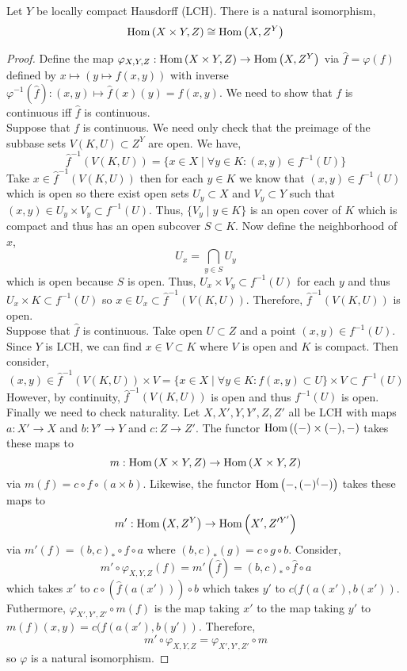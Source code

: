 \documentclass[12pt]{extarticle}
\begin{document}
\begin{lemma}
Let $Y$ be locally compact Hausdorff (LCH). There is a natural isomorphism,
\[\mathrm{Hom}\left( X \times Y, Z \right) \cong \mathrm{Hom}\left( X, Z^Y \right)\]
\end{lemma}

\begin{proof}
Define the map $\varphi_{X,Y,Z} : \mathrm{Hom}\left( X \times Y, Z \right) \to \mathrm{Hom}\left( X, Z^Y \right)$ via $\hat{f} = \varphi(f)$ defined by $x \mapsto (y \mapsto f(x, y))$ with inverse $\varphi^{-1}(\hat{f}) : (x, y) \mapsto \hat{f}(x)(y) = f(x, y)$. We need to show that $f$ is continuous iff $\hat{f}$ is continuous. 
\bigskip
\\
Suppose that $f$ is continuous. We need only check that the preimage of the subbase sets $V(K, U) \subset Z^Y$ are open. We have,
\[ \hat{f}^{-1}(V(K, U)) = \{ x \in X \mid \forall y \in K : (x, y) \in f^{-1}(U) \} \]
Take $x \in \hat{f}^{-1}(V(K, U))$ then for each $y \in K$ we know that $(x, y) \in f^{-1}(U)$ which is open so there exist open sets $U_y \subset X$ and $V_y \subset Y$ such that $(x, y) \in U_y \times V_y \subset f^{-1}(U)$. Thus, $\{ V_y \mid y \in K \}$ is an open cover of $K$ which is compact and thus has an open subcover $S \subset K$. Now define the neighborhood of $x$,
\[ U_x = \bigcap_{y \in S} U_y \]
which is open because $S$ is open. Thus, $U_x \times V_y \subset f^{-1}(U)$ for each $y$ and thus $U_x \times K \subset f^{-1}(U)$ so $x \in U_x \subset \hat{f}^{-1}(V(K, U))$. Therefore, $\hat{f}^{-1}(V(K, U))$ is open. 
\bigskip
\\
Suppose that $\hat{f}$ is continuous. Take open $U \subset Z$ and a point $(x, y) \in f^{-1}(U)$. Since $Y$ is LCH, we can find $x \in V \subset K$ where $V$ is open and $K$ is compact. Then consider,
\[ (x, y) \in \hat{f}^{-1}(V(K, U)) \times V = \{ x \in X \mid \forall y \in K : f(x, y) \subset U \} \times V \subset f^{-1}(U)  \]
However, by continuity, $\hat{f}^{-1}(V(K, U))$ is open and thus $f^{-1}(U)$ is open.
\bigskip
\\
Finally we need to check naturality. Let $X, X', Y, Y', Z, Z'$ all be LCH with maps $a : X' \to X$ and $b : Y' \to Y$ and $c : Z \to Z'$. The functor $\mathrm{Hom}\left( (-)\times(-), - \right)$ takes these maps to
\[m : \mathrm{Hom}\left( X \times Y, Z \right) \to \mathrm{Hom}\left( X \times Y, Z \right)\]
via $m(f) = c \circ f \circ (a \times b)$. Likewise, the functor $\mathrm{Hom}\left( -, (-)^(-) \right)$ takes these maps to 
\[m' : \mathrm{Hom}\left( X, Z^Y \right) \to \mathrm{Hom}\left( X', Z'^{Y'} \right)\]
via $m'(f) = (b, c)_* \circ f \circ a$ where $(b, c)_*(g) = c \circ g \circ b$. Consider, 
\[ m' \circ \varphi_{X, Y, Z}(f) = m'(\hat{f}) = (b, c)_* \circ \hat{f} \circ a \] which takes $x'$ to $c \circ (\hat{f}(a(x'))) \circ b$ which takes $y'$ to $c(f(a(x'), b(x'))$. Futhermore, $\varphi_{X', Y', Z'} \circ m(f)$ is the map taking $x'$ to the map taking $y'$ to $m(f)(x,y) = c(f(a(x'), b(y'))$. Therefore, 
\[ m' \circ \varphi_{X, Y, Z} = \varphi_{X', Y', Z'} \circ m \]
so $\varphi$ is a natural isomorphism. 
\end{proof}
\end{document}
